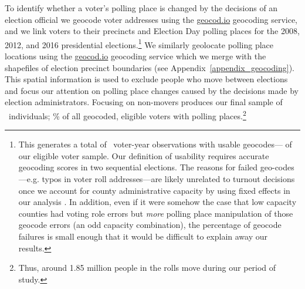 \documentclass[12pt]{article}
\begin{document}

To identify whether a voter's polling place is changed by the decisions of an election official we geocode voter addresses using the \url{geocod.io} geocoding service, and we link voters to their precincts and Election Day polling places for the 2008, 2012, and 2016 presidential elections.\footnote{This generates a total of \unskip~voter-year observations with usable geocodes--- of our eligible voter sample. Our definition of usability requires accurate geocoding scores in two sequential elections. The reasons for failed geo-codes---e.g. typos in voter roll addresses---are likely unrelated to turnout decisions once we account for county administrative capacity by using fixed effects in our analysis \citep{merivaki}.  In addition, even if it were somehow the case that low capacity counties had voting role errors but \emph{more} polling place manipulation of those geocode errors (an odd capacity combination), the percentage of geocode failures is small enough that it would be difficult to explain away our results.  } We similarly geolocate polling place locations using the \url{geocod.io} geocoding service which we merge with the shapefiles of election precinct boundaries (see Appendix~\ref{appendix_geocoding}). This spatial information is used to exclude people who move between elections and focus our attention on polling place changes caused by the decisions made by election administrators. Focusing on non-movers produces our final sample of \unskip~individuals; \unskip\% of all geocoded, eligible voters with polling places.\footnote{Thus, around 1.85 million people in the rolls move during our period of study.}
\end{document}
